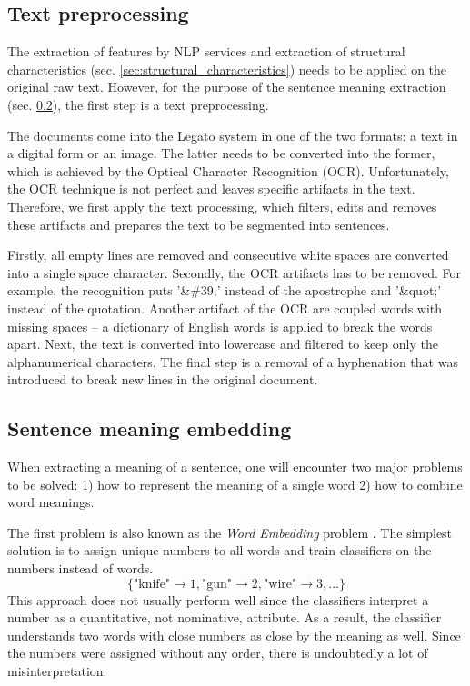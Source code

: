 \documentclass[
  digital, %
  notable,   %
  nolof,     %
  nolot,     %
  draft
]{fithesis3}
\begin{document}
\subsection{Text preprocessing}
The extraction of features by NLP services and extraction of structural characteristics (sec. \ref{sec:structural_characteristics}) needs to be applied on the original raw text.
However, for the purpose of the sentence meaning extraction (sec. \ref{sec:sentence-meaning}), the first step is a text preprocessing.

The documents come into the Legato system in one of the two formats: a text in a digital form or an image.
The latter needs to be converted into the former, which is achieved by the Optical Character Recognition (OCR).
Unfortunately, the OCR technique is not perfect and leaves specific artifacts in the text.
Therefore, we first apply the text processing, which filters, edits and removes these artifacts and prepares the text to be segmented into sentences.

Firstly, all empty lines are removed and consecutive white spaces are converted into a single space character.
Secondly, the OCR artifacts has to be removed.
For example, the recognition puts '\&\#39;' instead of the apostrophe and '\&quot;' instead of the quotation.
Another artifact of the OCR are coupled words with missing spaces -- a dictionary of English words is applied to break the words apart.
Next, the text is converted into lowercase and filtered to keep only the alphanumerical characters.
The final step is a removal of a hyphenation that was introduced to break new lines in the original document.

\subsection{Sentence meaning embedding}
\label{sec:sentence-meaning}
When extracting a meaning of a sentence, one will encounter two major problems to be solved: 1) how to represent the meaning of a single word 2) how to combine word meanings.

The first problem is also known as the \textit{Word Embedding} problem \cite{wordEmbeddings}.
The simplest solution is to assign unique numbers to all words and train classifiers on the numbers instead of words.
$$
\{\text{"knife"} \rightarrow 1, \text{"gun"} \rightarrow 2, \text{"wire"} \rightarrow 3, \dots\}
$$
This approach does not usually perform well since the classifiers interpret a number as a quantitative, not nominative,  attribute.
As a result, the classifier understands two words with close numbers as close by the meaning as well.
Since the numbers were assigned without any order, there is undoubtedly a lot of misinterpretation.
\end{document}
